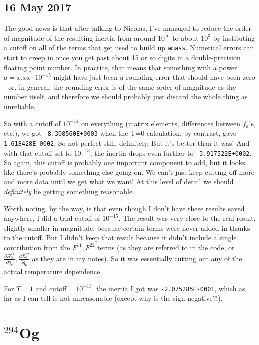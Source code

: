 \documentclass[]{report}
\begin{document}
\subsection*{16 May 2017}

The good news is that after talking to Nicolas, I've managed to reduce the order of magnitude of the resulting inertia from around $10^\infty$ to about $10^3$ by instituting a cutoff on all of the terms that get used to build up \verb|amass|. Numerical errors can start to creep in once you get past about 15 or so digits in a double-precision floating point number. In practice, that means that something with a power $a=x.xx\cdot10^{-15}$ might have just been a rounding error that should have been zero - or, in general, the rounding error is of the same order of magnitude as the number itself, and therefore we should probably just discard the whole thing as unreliable.

So with a cutoff of $10^{-14}$ on everything (matrix elements, differences between $f_a$'s, etc.), we got \verb|-8.308560E+0003| when the T=0 calculation, by contrast, gave \verb|1.618428E-0002|. So not perfect still, definitely. But it's better than it was! And with that cutoff set to $10^{-13}$, the inertia drops even further to \verb|-3.917522E+0002|. So again, this cutoff is probably one important component to add, but it looks like there's probably something else going on. We can't just keep cutting off more and more data until we get what we want! At this level of detail we should \textit{definitely} be getting something reasonable.

Worth noting, by the way, is that even though I don't have these results saved anywhere, I did a trial cutoff of $10^{-15}$. The result was very close to the real result: slightly smaller in magnitude, because certain terms were never added in thanks to the cutoff. But I didn't keep that result because it didn't include a single contribution from the $F^{11}, F^{22}$ terms (as they are referred to in the code, or $\frac{\partial\mathcal{R}^{11}_{0}}{\partial q_\nu}, \frac{\partial\mathcal{R}^{22}_{0}}{\partial q_\mu}$ as they are in my notes). So it was essentially cutting out any of the actual temperature dependence.

For $T=1$ and cutoff$=10^{-13}$, the inertia I got was \verb|-2.075285E-0001|, which as far as I can tell is not unreasonable (except why is the sign negative?!).

\section*{$^{294}$Og}
\end{document}
